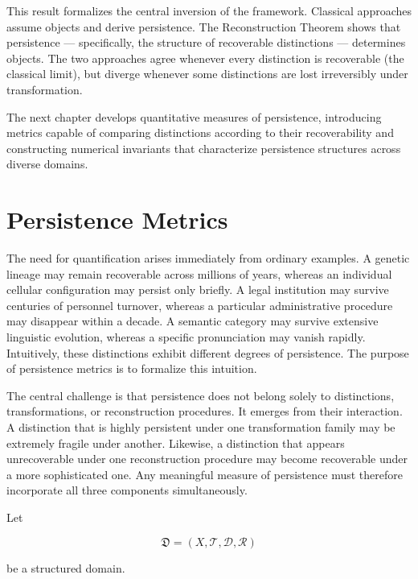 \documentclass[12pt,oneside]{article}
\theoremstyle{definition}
\begin{document}
\begin{remark}

This result formalizes the central inversion of the framework. Classical approaches assume objects and derive persistence. The Reconstruction Theorem shows that persistence --- specifically, the structure of recoverable distinctions --- determines objects. The two approaches agree whenever every distinction is recoverable (the classical limit), but diverge whenever some distinctions are lost irreversibly under transformation.

\end{remark}

The next chapter develops quantitative measures of persistence, introducing metrics capable of comparing distinctions according to their recoverability and constructing numerical invariants that characterize persistence structures across diverse domains.

\section{Persistence Metrics}

The need for quantification arises immediately from ordinary examples. A genetic lineage may remain recoverable across millions of years, whereas an individual cellular configuration may persist only briefly. A legal institution may survive centuries of personnel turnover, whereas a particular administrative procedure may disappear within a decade. A semantic category may survive extensive linguistic evolution, whereas a specific pronunciation may vanish rapidly. Intuitively, these distinctions exhibit different degrees of persistence. The purpose of persistence metrics is to formalize this intuition.

The central challenge is that persistence does not belong solely to distinctions, transformations, or reconstruction procedures. It emerges from their interaction. A distinction that is highly persistent under one transformation family may be extremely fragile under another. Likewise, a distinction that appears unrecoverable under one reconstruction procedure may become recoverable under a more sophisticated one. Any meaningful measure of persistence must therefore incorporate all three components simultaneously.

Let

\[
\mathfrak D
=
(X,\mathcal T,\mathcal D,\mathcal R)
\]

be a structured domain.
\end{document}
